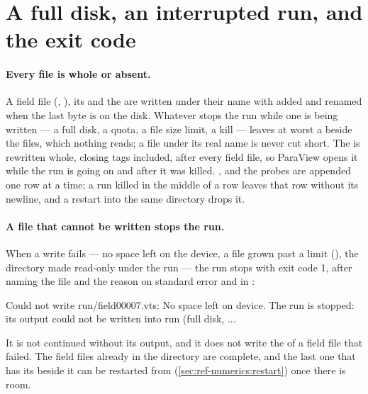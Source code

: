 \section{A full disk, an interrupted run, and the exit code}
\label{sec:output:failures}

\paragraph{Every file is whole or absent.} A field file (,
), its  and the  are written
under their name with  added and renamed when the last byte is on
the disk. Whatever stops the run while one is being written --- a full disk,
a quota, a file size limit, a kill --- leaves at worst a  beside
the files, which nothing reads; a file under its real name is never cut
short. The  is rewritten whole, closing tags included, after every
field file, so ParaView opens it while the run is going on and after it was
killed. ,  and the probes are appended
one row at a time; a run killed in the middle of a row leaves that row without
its newline, and a restart into the same directory drops it.

\paragraph{A file that cannot be written stops the run.} When a write fails ---
no space left on the device, a file grown past a limit
(), the directory made read-only under the run --- the run
stops with exit code 1, after naming the file and the reason on standard
error and in :

\begin{plain}
Could not write run/field00007.vts: No space left on device.
The run is stopped: its output could not be written into run (full disk, ...
\end{plain}

It is not continued without its output, and it does not write the
 of a field file that failed. The field files already in the
directory are complete, and the last one that has its  beside it
can be restarted from (\cref{sec:ref-numerics:restart}) once there is room.

